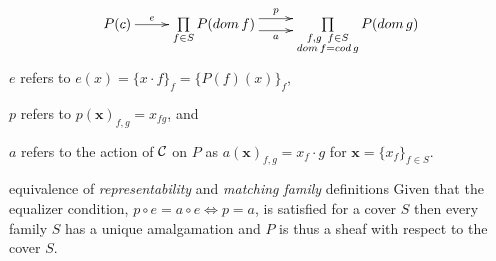 \begin{frame}
\begin{block}{}
\begin{displaymath}
\xymatrix{
P(c) \ar[r]^-{e}
&
\prod\limits_{f \in S}
P(dom \, f)
\ar@<1ex>[r]^-{p} \ar@<-1ex>[r]_-{a}
&
\prod\limits_{\substack{f,g \,\,\, f \in S \\ dom \, f=cod \, g}}
P(dom \, g)
}
\end{displaymath}
$e$ refers to $e(x)=\{x \cdot f\}_f = \{P(f)(x)\}_f$, 

$p$ refers to $p( \mathbf{x} )_{f,g} = x_{fg}$, and 

$a$ refers to the action of ${\mathcal C}$ on $P$ as $a( \mathbf{x} )_{f,g} = x_f \cdot g$ for $\mathbf{x} = \{ x_f \}_{f \in S}$. 
\end{block}
\begin{block}{equivalence of {\it representability} and {\it matching family} definitions}
Given that the equalizer condition, $p \circ e = a \circ e \Leftrightarrow p=a$, is satisfied for a cover $S$ then every family $S$ has a unique amalgamation and $P$ is thus a sheaf with respect to the cover $S$.
\end{block}
\end{frame}